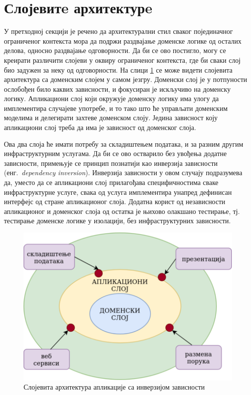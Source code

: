 \documentclass[12pt,oneside]{memoir}
\begin{document}
\section{Слојевитe архитектурe}\label{sectionslojevitaarhitektura}
У претходној секцији је речено да архитектурални стил сваког појединачног ограниченог контекста мора да подржи раздвајање доменске логике од осталих делова, односно раздвајање одговорности. Да би се ово постигло, могу се креирати различити слојеви у оквиру ограниченог контекста, где би сваки слој био задужен за неку од одговорности. На слици \ref{fig:inverzijazavisnosti} се може видети слојевита архитектура са доменским слојем у самом језгру. Доменски слој је у потпуности ослобођен било каквих зависности, и фокусиран је искључиво на доменску логику. Апликациони слој који окружује доменску логику има улогу да имплементира случајеве употребе, и то тако што ће управљати доменским моделима и делегирати захтеве доменском слоју. Једина зависност коју апликациони слој треба да има је зависност од доменског слоја.

Ова два слоја ће имати потребу за складиштењем података, и за разним другим инфраструктурним услугама. Да би се ово остварило без увођења додатне зависности, примењује се принцип познатији као инверзија зависности (енг.~\textit{dependency inversion}). Инверзија зависности у овом случају подразумева да, уместо да се апликациони слој прилагођава специфичностима сваке инфраструктурне услуге, свака од услуга имплементира унапред дефинисан интерфејс од стране апликационог слоја. Додатна корист од независности апликационог и доменског слоја од остатка је њихово олакшано тестирање, тј. тестирање доменске логике у изолацији, без инфраструктурних зависности.
\begin{figure}[!ht]
  \centering
  \includegraphics[scale=0.7]{slike/inverzija-zavisnosti.png}
  \caption{Слојевита архитектура апликације са инверзијом зависности}
  \label{fig:inverzijazavisnosti}
\end{figure}
\end{document}
